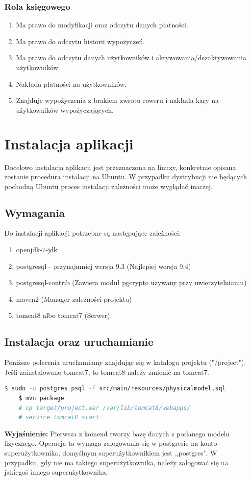 \documentclass{article}
\begin{document}
\subsubsection{Rola księgowego}
\begin{enumerate}
	\item Ma prawo do modyfikacji oraz odczytu danych płatności.
	\item Ma prawo do odczytu historii wypożyczeń.
	\item Ma prawo do odczytu danych użytkowników i aktywowania/dezaktywowania użytkowników.
	\item Nakłada płatności na użytkowników.
	\item Znajduje wypożyczenia z brakiem zwrotu roweru i nakłada kary na użytkowników wypożyczających.
\end{enumerate}

\section{Instalacja aplikacji}
Docelowo instalacja aplikacji jest przeznaczona na linuxy, konkretnie opisana zostanie procedura instalacji na Ubuntu.
W przypadku dystrybucji nie będących pochodną Ubuntu proces instalacji zależności może wyglądać inaczej.
\subsection{Wymagania}
Do instalacji aplikacji potrzebne są następujące zależności:
\begin{enumerate}
	\item openjdk-7-jdk
	\item postgresql - przynajmniej wersja 9.3 (Najlepiej wersja 9.4)
	\item postgresql-contrib (Zawiera moduł pgcrypto używany przy uwierzytelnianiu)
	\item maven2 (Manager zależności projektu)
	\item tomcat8 albo tomcat7 (Serwer)
\end{enumerate}

\subsection{Instalacja oraz uruchamianie}
Poniższe polecenia uruchamiamy znajdując się w katalogu projektu ("/project"). Jeśli zainstalowano
tomcat7, to tomcat8 należy zmienić na tomcat7.
\begin{lstlisting}[language=bash]
	$ sudo -u postgres psql -f src/main/resources/physicalmodel.sql
	$ mvn package
	# cp target/project.war /var/lib/tomcat8/webapps/
	# service tomcat8 start
\end{lstlisting}
\textbf{Wyjaśnienie:} Pierwsza z komend tworzy bazę danych z podanego modelu fizycznego. Operacja ta wymaga
zalogowania się w postgresie na konto superużytkownika, domyślnym superużytkownikiem jest ,,postgres".
W przypadku, gdy nie ma takiego superużytkownika, należy zalogować się na jakiegoś innego superużytkownika.
\end{document}
